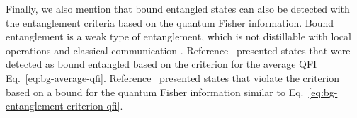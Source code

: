 Finally, we also mention that bound entangled states can also be detected with the entanglement criteria based on the quantum Fisher information.
Bound entanglement is a weak type of entanglement, which is not distillable with local operations and classical communication \citep{Horodecki2009, Guehne2009}.
Reference~\citep{Hyllus2012} presented states that were detected as bound entangled based on the criterion for the average QFI Eq.~\eqref{eq:bg-average-qfi}.
Reference~\citep{Czekaj2015} presented states that violate the criterion based on a bound for the quantum Fisher information similar to Eq.~\eqref{eq:bg-entanglement-criterion-qfi}.
